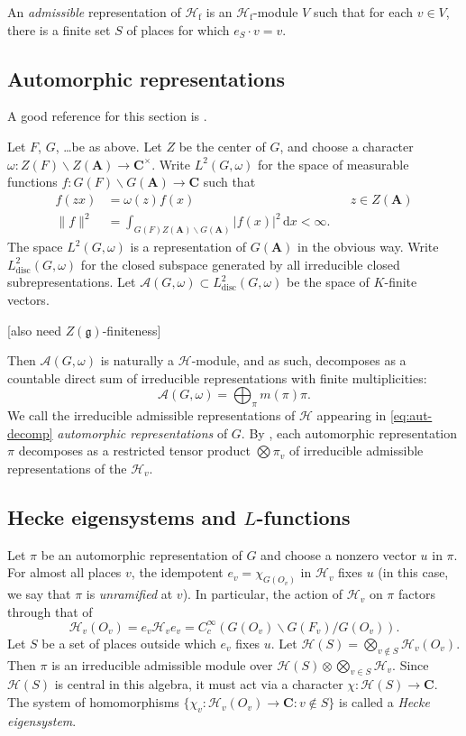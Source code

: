 \documentclass{article}
\newcommand{\cA}{\mathcal{A}}
\newcommand{\dA}{\mathbf{A}}
\newcommand{\dC}{\mathbf{C}}
\newcommand{\fg}{\mathfrak{g}}
\newcommand{\dd}{\mathrm{d}}
\newcommand{\discrete}{\mathrm{disc}}
\newcommand{\finite}{\mathrm{f}}
\newcommand{\hecke}{\mathcal{H}}
\begin{document}
An \emph{admissible} representation of $\hecke_\finite$ is an 
$\hecke_\finite$-module $V$ such that for each $v\in V$, there is a finite set 
$S$ of places for which $e_S\cdot v = v$. 


\subsection{Automorphic representations}

A good reference for this section is \cite{bj79}. 

Let $F$, $G$, \ldots be as above. Let $Z$ be the center of $G$, and choose a 
character $\omega:Z(F)\backslash Z(\dA)\to \dC^\times$. Write 
$L^2(G,\omega)$ for the space of measurable functions 
$f:G(F)\backslash G(\dA)\to \dC$ such that 
\begin{align*}
  f(z x) &= \omega(z) f(x) && z\in Z(\dA) \\
  \|f\|^2 &= \int_{G(F)Z(\dA)\backslash G(\dA)} |f(x)|^2\, \dd x < \infty .
\end{align*}
The space $L^2(G,\omega)$ is a representation of $G(\dA)$ in the obvious 
way. Write $L_\discrete^2(G,\omega)$ for the closed subspace generated by all 
irreducible closed subrepresentations. Let 
$\cA(G,\omega)\subset L_\discrete^2(G,\omega)$ be the space of $K$-finite 
vectors. 

[also need $Z(\fg)$-finiteness]

Then $\cA(G,\omega)$ is naturally a $\hecke$-module, and as such, 
decomposes as a countable direct sum of irreducible representations with finite 
multiplicities: 
\begin{equation}\label{eq:aut-decomp}
  \cA(G,\omega) = \bigoplus_\pi m(\pi) \pi .
\end{equation}
We call the irreducible admissible representations of $\hecke$ appearing in 
\eqref{eq:aut-decomp} \emph{automorphic representations} of $G$. By 
\cite[th.4]{f79}, each automorphic representation $\pi$ decomposes as a 
restricted tensor product $\bigotimes \pi_v$ of irreducible admissible 
representations of the $\hecke_v$. 


\subsection{Hecke eigensystems and \texorpdfstring{$L$}{L}-functions}

Let $\pi$ be an automorphic representation of $G$ and choose a nonzero vector 
$u$ in $\pi$. For almost all places $v$, the idempotent $e_v=\chi_{G(O_v)}$ in 
$\hecke_v$ fixes $u$ (in this case, we say that $\pi$ is \emph{unramified} at 
$v$). In particular, the action of $\hecke_v$ on $\pi$ factors 
through that of 
\[
  \hecke_v(O_v) = e_v \hecke_v e_v = C_c^\infty(G(O_v)\backslash G(F_v)/G(O_v)) .
\]
Let $S$ be a set of places outside which $e_v$ fixes $u$. Let 
$\hecke(S)=\bigotimes_{v\notin S} \hecke_v(O_v)$. Then $\pi$ is an irreducible 
admissible module over $\hecke(S)\otimes \bigotimes_{v\in S} \hecke_v$. Since 
$\hecke(S)$ is central in this algebra, it must act via a character 
$\chi:\hecke(S)\to \dC$. The system of homomorphisms 
$\{\chi_v:\hecke_v(O_v) \to \dC:v\notin S\}$ is called a \emph{Hecke 
eigensystem}. 
\end{document}
